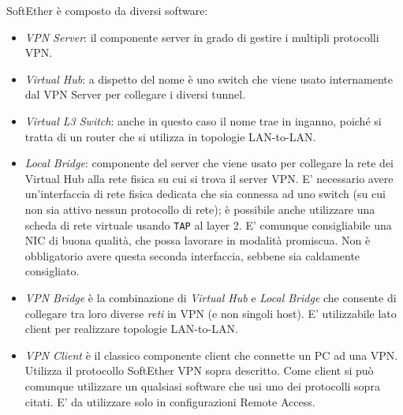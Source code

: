 SoftEther è composto da diversi software:
\begin{itemize}
  \item \textit{VPN Server}: il componente server in grado di gestire i multipli
  protocolli VPN.
  \item \textit{Virtual Hub}: a dispetto del nome è uno switch che viene usato internamente
  dal VPN Server per collegare i diversi tunnel.
  \item \textit{Virtual L3 Switch}: anche in questo caso il nome trae in inganno, poiché si tratta di un
  router che si utilizza in topologie LAN-to-LAN.
  \item \textit{Local Bridge}: componente del server che viene usato per collegare la rete dei Virtual Hub
  alla rete fisica su cui si trova il server VPN. E' necessario avere un'interfaccia di rete
  fisica dedicata che sia connessa ad uno switch (su cui non sia attivo nessun protocollo di rete);
  è possibile anche utilizzare una scheda di rete virtuale usando \texttt{TAP} al layer 2.
  E' comunque consigliabile
  una NIC di buona qualità, che possa lavorare in modalità promiscua. Non è obbligatorio
  avere questa seconda interfaccia, sebbene sia caldamente consigliato.
  \item \textit{VPN Bridge} è la combinazione di \textit{Virtual Hub} e \textit{Local Bridge} che consente
  di collegare tra loro diverse \textit{reti} in VPN (e non singoli host). E' utilizzabile
  lato client per realizzare topologie LAN-to-LAN.
  \item \textit{VPN Client} è il classico componente client che connette un PC ad una VPN. Utilizza il
  protocollo SoftEther VPN sopra descritto. Come client si può comunque utilizzare un qualsiasi software che
  usi uno dei protocolli sopra citati. E' da utilizzare solo in configurazioni Remote Access.
\end{itemize}


